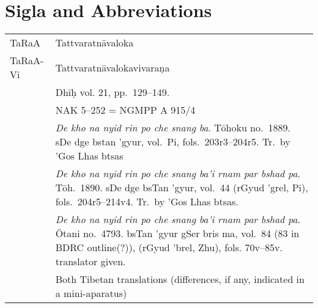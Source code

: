 \documentclass[12pt]{article}
\begin{document}
\section{Sigla and Abbreviations}
\noindent\begin{longtable}{ l p{12cm} }
	\noindent TaRaA & Tattvaratnāvaloka\\

	\noindent TaRaA-Vi & Tattvaratnāvalokavivaraṇa\\

	\noindent \EDD\ & Dhīḥ vol. 21, pp.\ 129–149.\\

	\noindent \MS\ & NAK 5–252 = NGMPP A 915/4\\

	\noindent \TM & \emph{De kho na nyid rin po che snang ba}. Tōhoku no.\ 1889. sDe dge bstan 'gyur, vol.\ Pi, fols.\ 203r3–204r5. Tr.\ by 'Gos Lhas btsas\\

	\noindent \TVA & \emph{De kho na nyid rin po che snang ba'i rnam par bshad pa}.  Tōh.\ 1890. sDe dge bsTan 'gyur, vol.\ 44 (rGyud 'grel, Pi), fols.\ 204r5–214v4. Tr.\ by 'Gos Lhas btsas.\\

	\noindent \TVB & \emph{De kho na nyid rin po che snang ba'i rnam par bshad pa}. Ōtani no.\ 4793. bsTan 'gyur gSer bris ma, vol.\ 84 (83 in BDRC outline(?)), (rGyud 'brel, Zhu), fols. 70v–85v. translator given.\\

	\noindent \TIB & Both Tibetan translations (differences, if any, indicated in a mini-aparatus)\\


\end{longtable}
\end{document}
